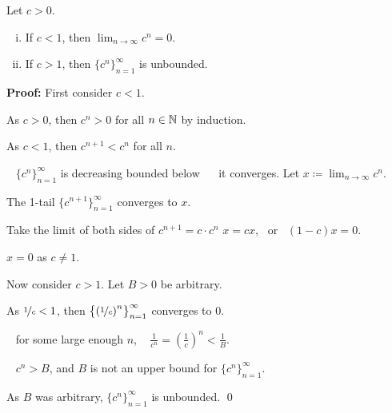 \documentclass[10pt,aspectratio=169]{beamer}
\begin{document}
\begin{frame}

\begin{proposition}
Let $c > 0$.
\pause
\begin{enumerate}[(i)]
\item
If $c < 1$, then
$\displaystyle
\lim_{n\to\infty} c^n = 0$.
\item
\pause
If $c > 1$, then $\{ c^n \}_{n=1}^\infty$ is unbounded.
\end{enumerate}
\end{proposition}

\pause
\textbf{Proof:}
First consider $c < 1$.

\pause
As $c > 0$, then $c^n > 0$ for all $n \in {\mathbb{N}}$ by induction.

\pause
As $c < 1$, then $c^{n+1} < c^n$ for all $n$.

\pause
\thus~ $\{ c^n \}_{n=1}^\infty$ is decreasing bounded below ~\thus~ it
converges.
\pause
Let $\displaystyle x \coloneqq \lim_{n\to\infty} c^n$.

\pause
The 1-tail $\{ c^{n+1} \}_{n=1}^\infty$ converges to $x$.

\pause
Take the limit of both sides of $c^{n+1} = c \cdot c^n$ \wthus  $x = cx$,
~or~ $(1-c)x=0$.

\pause
\thus \quad $x=0$ as $c \not= 1$.

\pause
\medskip

Now consider $c > 1$.
\pause
\quad
Let $B > 0$ be arbitrary.

\pause
As $\nicefrac{1}{c} < 1$, then $\bigl\{ {(\nicefrac{1}{c})}^n
\bigr\}_{n=1}^\infty$ converges to $0$.

\pause
\thus~ for some large enough $n$, ~
$\frac{1}{c^n} =
{\left(\frac{1}{c}\right)}^n < \frac{1}{B}$.

\pause
\thus ~ $c^n > B$, and $B$ is not an upper bound for $\{ c^n \}_{n=1}^\infty$.

\pause
As $B$ was arbitrary, $\{ c^n \}_{n=1}^\infty$ is unbounded.
\qed

\end{frame}
\end{document}
